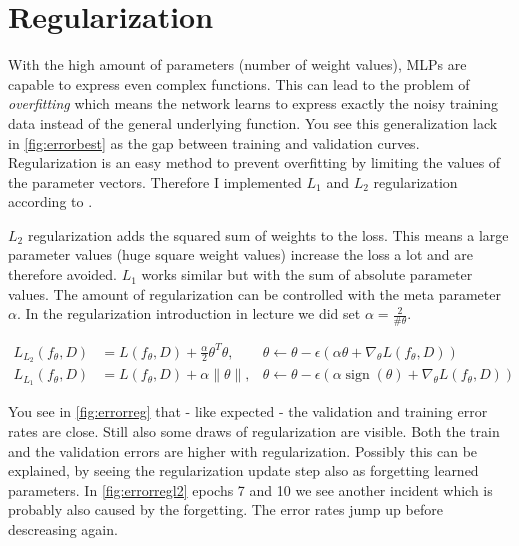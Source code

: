 \documentclass[a4paper,11pt]{article}
\begin{document}
\section{Regularization}\label{sec:regularization}

With the high amount of parameters (number of weight values), MLPs
are capable to express even complex functions.
This can lead to the problem of \emph{overfitting} which means the network
learns to express exactly the noisy training data instead of the general
underlying function. You see this generalization lack in \autoref{fig:errorbest}
as the gap between training and validation curves.
Regularization is an easy method to prevent overfitting by limiting the values
of the parameter vectors. Therefore I implemented
$L_1$ and $L_2$ regularization according to \cite{goodfellow71}.

$L_2$ regularization adds the squared sum of weights to the loss.
This means a large parameter values (huge square weight values) increase the loss a
lot and are therefore avoided. $L_1$ works similar but with the sum of absolute
parameter values. The amount of regularization can be controlled with the meta
parameter $\alpha$. In the regularization introduction in lecture we did set
$\alpha=\frac{2}{\#\theta}$.

\begin{align}
  L_{L_2}(f_\theta, D) &= L(f_\theta, D) + \frac{\alpha}{2} \theta^T \theta,
  &\theta \leftarrow \theta - \epsilon (\alpha \theta + \nabla_\theta L(f_\theta,
  D)) \\
  L_{L_1}(f_\theta, D) &= L(f_\theta, D) + \alpha \lVert \theta \rVert,
  &\theta \leftarrow \theta - \epsilon (\alpha \mathop{sign}(\theta) + \nabla_\theta L(f_\theta,D))
\end{align}

You see in \autoref{fig:errorreg} that - like expected - the validation and
training error rates are close.
Still also some draws of regularization are visible.
Both the train and the validation errors are higher with regularization.
Possibly this can be explained, by seeing the regularization update step also
as forgetting learned parameters.
In \autoref{fig:errorregl2} epochs 7 and 10 we see another incident which is
probably also caused by the forgetting. The error rates jump up before
descreasing again.
\end{document}
